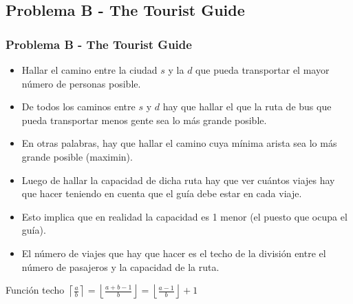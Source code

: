 \documentclass{beamer}
\begin{document}
	\subsection{Problema B - The Tourist Guide}
	\begin{frame}
		\frametitle{Problema B - The Tourist Guide}
		\begin{itemize}
			\item Hallar el camino entre la ciudad $s$ y la $d$ que pueda transportar el mayor número de personas posible.
			\item De todos los caminos entre $s$ y $d$ hay que hallar el que la ruta de bus que pueda transportar menos gente sea lo más grande posible.
			\item En otras palabras, hay que hallar el camino cuya mínima arista sea lo más grande posible (maximin).
		\end{itemize}
	\end{frame}
	
	\begin{frame}
		\begin{itemize}
			\item Luego de hallar la capacidad de dicha ruta hay que ver cuántos viajes hay que hacer teniendo en cuenta que el guía debe estar en cada viaje.
			\item Esto implica que en realidad la capacidad es 1 menor (el puesto que ocupa el guía).
			\item El número de viajes que hay que hacer es el techo de la división entre el número de pasajeros y la capacidad de la ruta.
		\end{itemize}
		\begin{block}{Función techo}
			$\displaystyle \left\lceil \frac{a}{b} \right\rceil = \left\lfloor \frac{a + b - 1}{b} \right\rfloor = \left\lfloor \frac{a - 1}{b} \right\rfloor + 1$
		\end{block}
	\end{frame}
	
\end{document}
